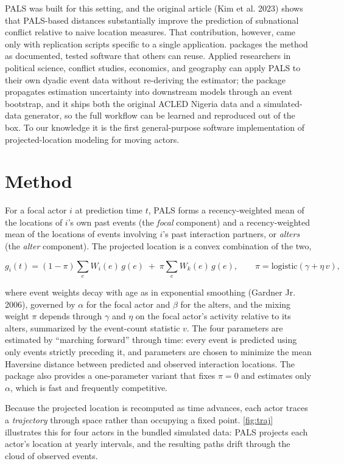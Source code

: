 \documentclass[10pt,a4paper,onecolumn]{article}
\let\textttOrig=\texttt
\def\texttt#1{\expandafter\textttOrig{\seqsplit{#1}}}
\begin{document}
PALS was built for this setting, and the original article (Kim et al. 2023)
shows that PALS-based distances substantially improve the prediction of
subnational conflict relative to naive location measures. That contribution,
however, came only with replication scripts specific to a single
application. \texttt{palsr} packages the method as documented, tested
software that others can reuse. Applied researchers in political science,
conflict studies, economics, and geography can apply PALS to their own
dyadic event data without re-deriving the estimator; the package propagates
estimation uncertainty into downstream models through an event bootstrap,
and it ships both the original ACLED Nigeria data and a simulated-data generator,
so the full workflow can be learned and reproduced out of the box. To our knowledge it is the
first general-purpose software implementation of projected-location
modeling for moving actors.

\section{Method}\label{method}

For a focal actor \(i\) at prediction time \(t\), PALS forms a
recency-weighted mean of the locations of \(i\)'s own past events (the
\emph{focal} component) and a recency-weighted mean of the locations of
events involving \(i\)'s past interaction partners, or \emph{alters}
(the \emph{alter} component). The projected location is a convex
combination of the two,

\[
g_i(t) = (1-\pi)\sum_e W_i(e)\, g(e) \;+\; \pi \sum_e W_k(e)\, g(e),
\qquad \pi = \mathrm{logistic}(\gamma + \eta\, v),
\]

where event weights decay with age as in exponential smoothing (Gardner Jr.
2006), governed by \(\alpha\) for the focal actor and \(\beta\) for the
alters, and the mixing weight \(\pi\) depends through \(\gamma\) and
\(\eta\) on the focal actor's activity relative to its alters, summarized by
the event-count statistic \(v\). The four parameters are estimated by
``marching forward'' through time: every event is predicted using only
events strictly preceding it, and parameters are chosen to minimize the mean
Haversine distance between predicted and observed interaction locations. The
package also provides a one-parameter variant that fixes \(\pi = 0\) and
estimates only \(\alpha\), which is fast and frequently competitive.

Because the projected location is recomputed as time advances, each
actor traces a \emph{trajectory} through space rather than occupying a
fixed point. \autoref{fig:traj} illustrates this for four actors in the
bundled simulated data: PALS projects each actor's location at yearly
intervals, and the resulting paths drift through the cloud of observed
events.
\end{document}
